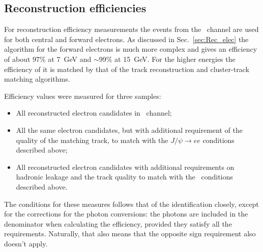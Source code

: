 \begin{figure}
\end{figure}


\subsection{Reconstruction efficiencies}

For reconstruction efficiency measurements the events from the \Zee\ channel are used for both central and forward electrons. As discussed in Sec.~\ref{sec:Rec_elec} the algorithm for the forward electrons is much more complex and gives an efficiency of about 97\% at 7~GeV and $\sim$99\% at 15~GeV. For the higher energies the efficiency of it is matched by that of the track reconstruction and cluster-track matching algorithms.

Efficiency values were measured for three samples:

\begin{itemize}
\item All reconstructed electron candidates in \Zee\ channel;
\item All the same electron candidates, but with additional requirement of the quality of the matching track, to match with the $J/\psi \to ee$ conditions described above;
\item All reconstructed electron candidates with additional requirements on hadronic leakage and the track quality to match with the \Wenu\ conditions described above.
\end{itemize}

The conditions for these measures follows that of the identification closely, except for the corrections for the photon conversions: the photons are included in the denominator when calculating the efficiency, provided they satisfy all the requirements. Naturally, that also means that the opposite sign requirement also doesn't apply.

